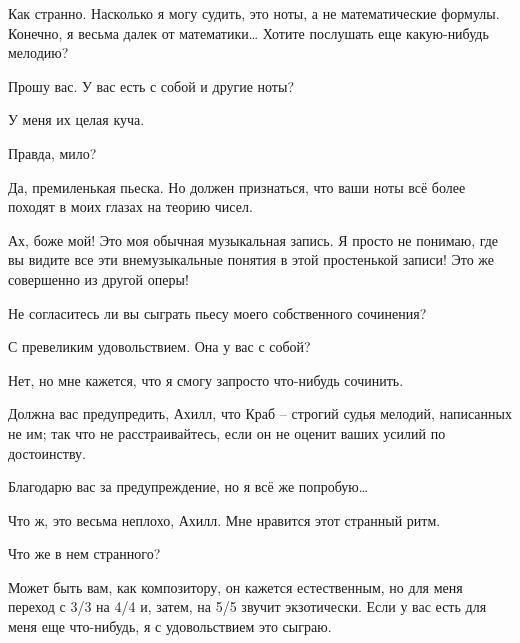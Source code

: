 \documentclass[../main.tex]{subfiles}
\begin{document}
\begin{dialogue}
 Как странно. Насколько я могу судить, это ноты, а не математические формулы. Конечно, я весьма далек от математики\ldots{} Хотите послушать еще какую-нибудь мелодию?

 Прошу вас. У вас есть с собой и другие ноты?

 У меня их целая куча.


Правда, мило?

 Да, премиленькая пьеска. Но должен признаться, что ваши ноты всё более походят в моих глазах на теорию чисел.

 Ах, боже мой! Это моя обычная музыкальная запись. Я просто не понимаю, где вы видите все эти внемузыкальные понятия в этой простенькой записи! Это же совершенно из другой оперы!

 Не согласитесь ли вы сыграть пьесу моего собственного сочинения?

 С превеликим удовольствием. Она у вас с собой?

 Нет, но мне кажется, что я смогу запросто что-нибудь сочинить.

 Должна вас предупредить, Ахилл, что Краб \--- строгий судья мелодий, написанных не им; так что не расстраивайтесь, если он не оценит ваших усилий по достоинству.

 Благодарю вас за предупреждение, но я всё же попробую\ldots{}


 Что ж, это весьма неплохо, Ахилл. Мне нравится этот странный ритм.

 Что же в нем странного?

 Может быть вам, как композитору, он кажется естественным, но для меня переход с 3/3 на 4/4 и, затем, на 5/5 звучит экзотически. Если у вас есть для меня еще что-нибудь, я с удовольствием это сыграю.


\end{dialogue}
\end{document}
